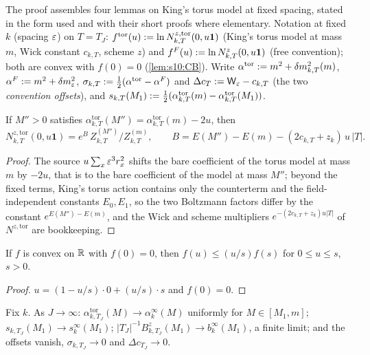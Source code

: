 The proof assembles four lemmas on King's torus model at fixed spacing, stated in the form used and with their short proofs where elementary. Notation at fixed $k$ (spacing $\varepsilon$) on $T=T_J$: $f^{\mathrm{tor}}(u):=\ln N^{z,\mathrm{tor}}_{k,T}(0,u\mathbf 1)$ (King's torus model at mass $m$, Wick constant $c_{k,T}$, scheme $z$) and $f^F(u):=\ln N^{z}_{k,T}(0,u\mathbf 1)$ (free convention); both are convex with $f(0)=0$ (\cref{lem:s10:CB}). Write $\alpha^{\mathrm{tor}}:= m^2+\delta m^2_{k,T}(m)$, $\alpha^F:= m^2+\delta m^2_{\varepsilon}$, $\sigma_{k,T}:=\frac12(\alpha^{\mathrm{tor}}-\alpha^F)$ and $\Delta c_T:=\mathsf W_{\varepsilon}-c_{k,T}$ (the two \emph{convention offsets}), and $s_{k,T}(M_1):=\frac12(\alpha^{\mathrm{tor}}_{k,T}(m)-\alpha^{\mathrm{tor}}_{k,T}(M_1))$.

\begin{lemma}\label{lem:s10:M}
If $M''>0$ satisfies $\alpha^{\mathrm{tor}}_{k,T}(M'')=\alpha^{\mathrm{tor}}_{k,T}(m)-2u$, then
\[
N^{z,\mathrm{tor}}_{k,T}(0,u\mathbf 1)=e^{B}\,Z^{(M'')}_{k,T}\big/Z^{(m)}_{k,T},\qquad B=E(M'')-E(m)-(2c_{k,T}+z_k)\,u\,|T| .
\]
\end{lemma}

\begin{proof}
The source $u\sum_x\varepsilon^3r_x^2$ shifts the bare coefficient of the torus model at mass $m$ by $-2u$, that is to the bare coefficient of the model at mass $M''$; beyond the fixed terms, King's torus action \cite[(2.4)]{K1} contains only the counterterm and the field-independent constants $E_0,E_1$, so the two Boltzmann factors differ by the constant $e^{E(M'')-E(m)}$, and the Wick and scheme multipliers $e^{-(2c_{k,T}+z_k)u|T|}$ of $N^{z,\mathrm{tor}}$ are bookkeeping.
\end{proof}

\begin{lemma}[chord]\label{lem:s10:C}
If $f$ is convex on $\mathbb R$ with $f(0)=0$, then $f(u)\le(u/s)f(s)$ for $0\le u\le s$, $s>0$.
\end{lemma}

\begin{proof}
$u=(1-u/s)\cdot0+(u/s)\cdot s$ and $f(0)=0$.
\end{proof}

\begin{lemma}\label{lem:s10:V}
Fix $k$. As $J\to\infty$: $\alpha^{\mathrm{tor}}_{k,T_J}(M)\to\alpha^\infty_k(M)$ uniformly for $M\in[M_1,m]$; $s_{k,T_J}(M_1)\to s^\infty_k(M_1)$; $|T_J|^{-1}B^z_{k,T_J}(M_1)\to b^\infty_k(M_1)$, a finite limit; and the offsets vanish, $\sigma_{k,T_J}\to0$ and $\Delta c_{T_J}\to0$.
\end{lemma}

